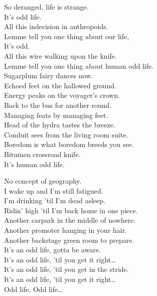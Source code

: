 So deranged, life is strange. \\
It's  odd life. \\

All this indecision in anthropoids. \\
Lemme tell you one thing about our life, \\
It's odd. \\
All this wire walking upon the knife. \\
Lemme tell you one thing about human odd life. \\

Sugarplum fairy dances now. \\
Echoed feet on the hallowed ground. \\
Energy peaks on the voyager's crown. \\
Back to the bus for another round. \\
Managing feats by managing feet. \\
Head of the hydra tastes the breeze. \\
Conduit sees from the living room suite. \\
Boredom is what boredom breeds you see. \\

Bitumen crossroad knife. \\
It's human odd life. \\


No concept of geography. \\
I wake up and I'm still fatigued. \\
I'm drinking 'til I'm dead asleep. \\
Ridin' high 'til I'm back home in one piece. \\
Another carpark in the middle of nowhere. \\
Another promoter hanging in your hair. \\
Another backstage green room to prepare. \\
It's an odd life, gotta be aware. \\

It's an odd life, 'til you get it right… \\
It's an odd life, 'til you get in the stride. \\

It's an odd life, 'til you get it right… \\

Odd life. Odd life… \\

